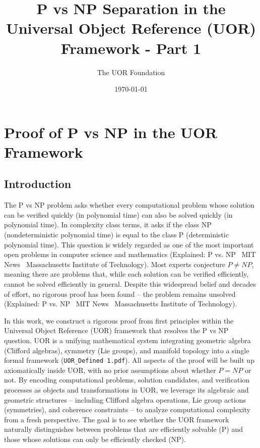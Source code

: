 \documentclass[11pt]{article}
\title{P vs NP Separation in the Universal Object Reference (UOR) Framework - Part 1}
\author{The UOR Foundation}
\date{\today}
\begin{document}
\maketitle

\section{Proof of P vs NP in the UOR Framework}

\subsection{Introduction}
The P vs NP problem asks whether every computational problem whose solution can be verified quickly (in polynomial time) can also be solved quickly (in polynomial time). In complexity class terms, it asks if the class NP (nondeterministic polynomial time) is equal to the class P (deterministic polynomial time). This question is widely regarded as one of the most important open problems in computer science and mathematics (Explained: P vs. NP \textbar\ MIT News \textbar\ Massachusetts Institute of Technology). Most experts conjecture \(P \neq NP\), meaning there are problems that, while each solution can be verified efficiently, cannot be solved efficiently in general. Despite this widespread belief and decades of effort, no rigorous proof has been found -- the problem remains unsolved (Explained: P vs. NP \textbar\ MIT News \textbar\ Massachusetts Institute of Technology).

In this work, we construct a rigorous proof from first principles within the Universal Object Reference (UOR) framework that resolves the P vs NP question. UOR is a unifying mathematical system integrating geometric algebra (Clifford algebras), symmetry (Lie groups), and manifold topology into a single formal framework (\texttt{UOR\_Defined 1.pdf}). All aspects of the proof will be built up axiomatically inside UOR, with no prior assumptions about whether \(P = NP\) or not. By encoding computational problems, solution candidates, and verification processes as objects and transformations in UOR, we leverage its algebraic and geometric structures -- including Clifford algebra operations, Lie group actions (symmetries), and coherence constraints -- to analyze computational complexity from a fresh perspective. The goal is to see whether the UOR framework naturally distinguishes between problems that are efficiently solvable (P) and those whose solutions can only be efficiently checked (NP).
\end{document}
